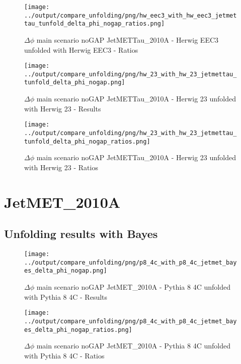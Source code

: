 \documentclass[11pt]{book}
\begin{document}
\begin{figure}[ht]
\centering
\texttt{[image: ../output/compare\_unfolding/png/hw\_eec3\_with\_hw\_eec3\_jetmettau\_tunfold\_delta\_phi\_nogap\_ratios.png]}
\caption{$\Delta\phi$ main scenario noGAP JetMETTau\_2010A - Herwig EEC3 unfolded with Herwig EEC3 - Ratios}
\label{hw_eec3_hw_eec3_jetmettau_tunfold_delta_phi_nogap_b}
\end{figure}

\begin{figure}[ht]
\centering
\texttt{[image: ../output/compare\_unfolding/png/hw\_23\_with\_hw\_23\_jetmettau\_tunfold\_delta\_phi\_nogap.png]}
\caption{$\Delta\phi$ main scenario noGAP JetMETTau\_2010A - Herwig 23 unfolded with Herwig 23 - Results}
\label{hw_23_hw_23_jetmettau_tunfold_delta_phi_nogap_a}
\end{figure}

\begin{figure}[ht]
\centering
\texttt{[image: ../output/compare\_unfolding/png/hw\_23\_with\_hw\_23\_jetmettau\_tunfold\_delta\_phi\_nogap\_ratios.png]}
\caption{$\Delta\phi$ main scenario noGAP JetMETTau\_2010A - Herwig 23 unfolded with Herwig 23 - Ratios}
\label{hw_23_hw_23_jetmettau_tunfold_delta_phi_nogap_b}
\end{figure}

\section{JetMET\_2010A}
\subsection{Unfolding results with Bayes}

\begin{figure}[ht]
\centering
\texttt{[image: ../output/compare\_unfolding/png/p8\_4c\_with\_p8\_4c\_jetmet\_bayes\_delta\_phi\_nogap.png]}
\caption{$\Delta\phi$ main scenario noGAP JetMET\_2010A - Pythia 8 4C unfolded with Pythia 8 4C - Results}
\label{p8_p8_jetmet_bayes_delta_phi_nogap_a}
\end{figure}

\begin{figure}[ht]
\centering
\texttt{[image: ../output/compare\_unfolding/png/p8\_4c\_with\_p8\_4c\_jetmet\_bayes\_delta\_phi\_nogap\_ratios.png]}
\caption{$\Delta\phi$ main scenario noGAP JetMET\_2010A - Pythia 8 4C unfolded with Pythia 8 4C - Ratios}
\label{p8_p8_jetmet_bayes_delta_phi_nogap_b}
\end{figure}
\end{document}
